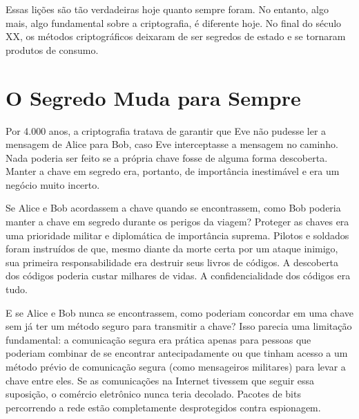 \documentclass{book}
\begin{document}
Essas lições são tão verdadeiras hoje quanto sempre foram. No entanto, algo mais, algo fundamental sobre a criptografia, é diferente hoje. No final do século XX, os métodos criptográficos deixaram de ser segredos de estado e se tornaram produtos de consumo.


\section{O Segredo Muda para Sempre}
\label{segredos:muda}

Por 4.000 anos, a criptografia tratava de garantir que Eve não pudesse ler a mensagem de Alice para Bob, caso Eve interceptasse a mensagem no caminho. Nada poderia ser feito se a própria chave fosse de alguma forma descoberta. Manter a chave em segredo era, portanto, de importância inestimável e era um negócio muito incerto.

Se Alice e Bob acordassem a chave quando se encontrassem, como Bob poderia manter a chave em segredo durante os perigos da viagem? Proteger as chaves era uma prioridade militar e diplomática de importância suprema. Pilotos e soldados foram instruídos de que, mesmo diante da morte certa por um ataque inimigo, sua primeira responsabilidade era destruir seus livros de códigos. A descoberta dos códigos poderia custar milhares de vidas. A confidencialidade dos códigos era tudo.

E se Alice e Bob nunca se encontrassem, como poderiam concordar em uma chave sem já ter um método seguro para transmitir a chave? Isso parecia uma limitação fundamental: a comunicação segura era prática apenas para pessoas que poderiam combinar de se encontrar antecipadamente ou que tinham acesso a um método prévio de comunicação segura (como mensageiros militares) para levar a chave entre eles. Se as comunicações na Internet tivessem que seguir essa suposição, o comércio eletrônico nunca teria decolado. Pacotes de bits percorrendo a rede estão completamente desprotegidos contra espionagem.
\end{document}
